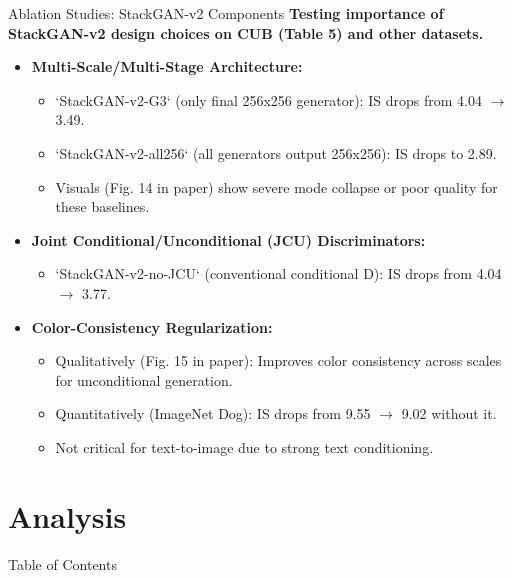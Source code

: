 \documentclass{beamer}
\newcommand{\paperfigure}[3][width=\textwidth]{%
    \begin{figure}%
        \centering%
        \texttt{[image: figures/\#2.png]}%
        \caption{#3 (Source:~\cite{stackgan++})}%
    \end{figure}%
}
\begin{document}
\begin{frame}{Ablation Studies: StackGAN-v2 Components}
    \textbf{Testing importance of StackGAN-v2 design choices on CUB (Table 5) and other datasets.}
    \begin{itemize}
        \item \textbf{Multi-Scale/Multi-Stage Architecture:}
            \begin{itemize}
                \item `StackGAN-v2-G3` (only final 256x256 generator): IS drops from 4.04 $\rightarrow$ 3.49.
                \item `StackGAN-v2-all256` (all generators output 256x256): IS drops to 2.89.
                \item Visuals (Fig. 14 in paper) show severe mode collapse or poor quality for these baselines.
            \end{itemize}
        \item \textbf{Joint Conditional/Unconditional (JCU) Discriminators:}
            \begin{itemize}
                \item `StackGAN-v2-no-JCU` (conventional conditional D): IS drops from 4.04 $\rightarrow$ 3.77.
            \end{itemize}
        \item \textbf{Color-Consistency Regularization:}
            \begin{itemize}
                \item Qualitatively (Fig. 15 in paper): Improves color consistency across scales for unconditional generation.
                \item Quantitatively (ImageNet Dog): IS drops from 9.55 $\rightarrow$ 9.02 without it.
                \item Not critical for text-to-image due to strong text conditioning.
            \end{itemize}
    \end{itemize}
\end{frame}

\section{Analysis}
\begin{frame}{Table of Contents}
    \tableofcontents[currentsection]
\end{frame}
\end{document}

